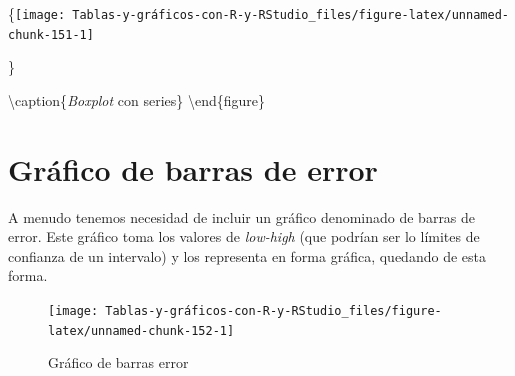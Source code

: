 \documentclass[
]{book}
\newenvironment{Shaded}{\begin{snugshade}}{\end{snugshade}}
\newcommand{\AttributeTok}[1]{\textcolor[rgb]{0.77,0.63,0.00}{#1}}
\newcommand{\ConstantTok}[1]{\textcolor[rgb]{0.00,0.00,0.00}{#1}}
\newcommand{\FunctionTok}[1]{\textcolor[rgb]{0.00,0.00,0.00}{#1}}
\newcommand{\NormalTok}[1]{#1}
\newcommand{\SpecialCharTok}[1]{\textcolor[rgb]{0.00,0.00,0.00}{#1}}
\newcommand{\StringTok}[1]{\textcolor[rgb]{0.31,0.60,0.02}{#1}}
\begin{document}
\{\centering \texttt{[image: Tablas-y-gráficos-con-R-y-RStudio\_files/figure-latex/unnamed-chunk-151-1]}

\}

\textbackslash caption\{\emph{Boxplot} con series\}\label{fig:unnamed-chunk-151}
\textbackslash end\{figure\}

\hypertarget{gruxe1fico-de-barras-de-error}{%
\section{Gráfico de barras de error}\label{gruxe1fico-de-barras-de-error}}

A menudo tenemos necesidad de incluir un gráfico denominado de barras de error. Este gráfico toma los valores de \emph{low-high} (que podrían ser lo límites de confianza de un intervalo) y los representa en forma gráfica, quedando de esta forma.

\begin{Shaded}
\end{Shaded}

\begin{figure}[H]

{\centering \texttt{[image: Tablas-y-gráficos-con-R-y-RStudio\_files/figure-latex/unnamed-chunk-152-1]} 

}

\caption{Gráfico de barras error}\label{fig:unnamed-chunk-152}
\end{figure}
\end{document}
